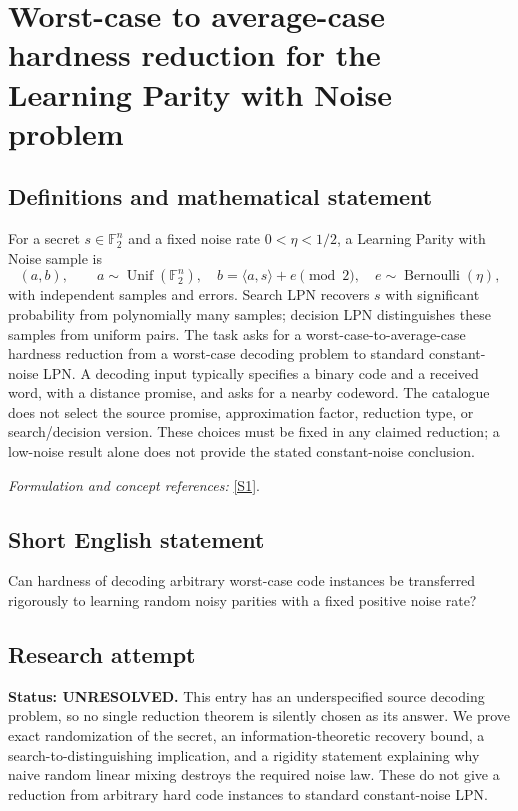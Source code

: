 \documentclass[11pt]{article}
\begin{document}
\section*{\texorpdfstring{Worst-case to average-case hardness reduction for the Learning Parity with Noise problem}{Worst-case to average-case hardness reduction for the Learning Parity with Noise problem}}\label{330}
\subsection{Definitions and mathematical statement}
For a secret $s\in{\mathbb{F}}_2^n$ and a fixed noise rate $0<\eta<1/2$, a Learning Parity with Noise sample is
\[
 (a,b),\qquad a\sim\operatorname{Unif}({\mathbb{F}}_2^n),\quad
 b=\langle a,s\rangle+e\pmod2,\quad e\sim\operatorname{Bernoulli}(\eta),
\]
with independent samples and errors. Search LPN recovers $s$ with significant probability from polynomially many samples; decision LPN distinguishes these samples from uniform pairs. The task asks for a worst-case-to-average-case hardness reduction from a worst-case decoding problem to standard constant-noise LPN. A decoding input typically specifies a binary code and a received word, with a distance promise, and asks for a nearby codeword. The catalogue does not select the source promise, approximation factor, reduction type, or search/decision version. These choices must be fixed in any claimed reduction; a low-noise result alone does not provide the stated constant-noise conclusion.
\par\smallskip\textit{Formulation and concept references:} \href{https://eprint.iacr.org/2026/1168}{[S1]}.

\subsection{Short English statement}
Can hardness of decoding arbitrary worst-case code instances be transferred rigorously to learning random noisy parities with a fixed positive noise rate?
\subsection{Research attempt}
\textbf{Status: UNRESOLVED.} This entry has an underspecified source decoding problem, so no single reduction theorem is silently chosen as its answer. We prove exact randomization of the secret, an information-theoretic recovery bound, a search-to-distinguishing implication, and a rigidity statement explaining why naive random linear mixing destroys the required noise law. These do not give a reduction from arbitrary hard code instances to standard constant-noise LPN.
\end{document}
